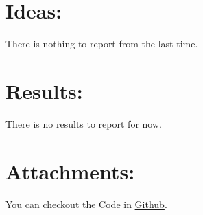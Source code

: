 \documentclass[a4paper, 11pt]{article}
\begin{document}
	\section*{Ideas:}
	There is nothing to report from the last time.
	
	\section*{Results:}
	There is no results to report for now.
	
	\section*{Attachments:}
	
	You can checkout the Code in \href{https://github.com/Ethiy/3DSceneModel}{Github}.
	
\end{document}
